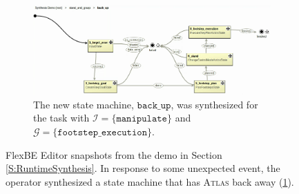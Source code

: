 \begin{figure}[t]
	\vspace{4 pt}
	\begin{subfigure}[b]{0.99\columnwidth}
	\includegraphics[width=0.99\columnwidth, clip]{./img/synthesis_runtime_synthesized_sm.png}
	\caption{The new state machine, $\mathtt{back\_up}$, was synthesized for the task with $\mathcal{I} = \{ \mathtt{manipulate} \}$ and $\mathcal{G} = \{ \mathtt{footstep\_execution} \}$.
	} 
	\label{Fig:runtime2}
	\end{subfigure}
	\caption{
	FlexBE Editor snapshots from the demo in Section \ref{S:RuntimeSynthesis}.
	In response to some unexpected event, the operator synthesized a state machine that has \textsc{Atlas} back away (\ref{Fig:runtime2}).
	}
	\label{Fig:synthesis_runtime_demo}
\end{figure}

%

